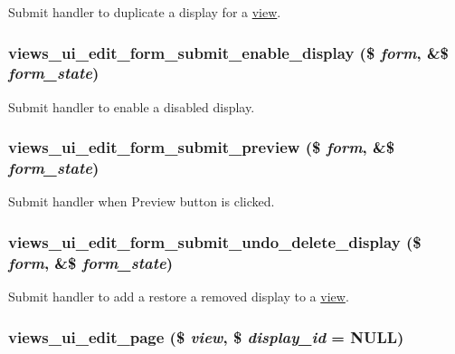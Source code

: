 \label{admin_8inc_ae053ac5c2b462e488e968d3e3ba78141}
Submit handler to duplicate a display for a \hyperlink{classview}{view}. \hypertarget{admin_8inc_af7a13d0c2cd085c0bf2486c1ded3b445}{
\subsubsection[{views\_\-ui\_\-edit\_\-form\_\-submit\_\-enable\_\-display}]{\setlength{\rightskip}{0pt plus 5cm}views\_\-ui\_\-edit\_\-form\_\-submit\_\-enable\_\-display (\$ {\em form}, \/  \&\$ {\em form\_\-state})}}
\label{admin_8inc_af7a13d0c2cd085c0bf2486c1ded3b445}
Submit handler to enable a disabled display. \hypertarget{admin_8inc_a8263cbb4980efaa11823aae67bce1e26}{
\subsubsection[{views\_\-ui\_\-edit\_\-form\_\-submit\_\-preview}]{\setlength{\rightskip}{0pt plus 5cm}views\_\-ui\_\-edit\_\-form\_\-submit\_\-preview (\$ {\em form}, \/  \&\$ {\em form\_\-state})}}
\label{admin_8inc_a8263cbb4980efaa11823aae67bce1e26}
Submit handler when Preview button is clicked. \hypertarget{admin_8inc_a82b6d7468aa9a3c2d86126ea0e61ec9f}{
\subsubsection[{views\_\-ui\_\-edit\_\-form\_\-submit\_\-undo\_\-delete\_\-display}]{\setlength{\rightskip}{0pt plus 5cm}views\_\-ui\_\-edit\_\-form\_\-submit\_\-undo\_\-delete\_\-display (\$ {\em form}, \/  \&\$ {\em form\_\-state})}}
\label{admin_8inc_a82b6d7468aa9a3c2d86126ea0e61ec9f}
Submit handler to add a restore a removed display to a \hyperlink{classview}{view}. \hypertarget{admin_8inc_ac6af463750fb21984d42b858c446635c}{
\subsubsection[{views\_\-ui\_\-edit\_\-page}]{\setlength{\rightskip}{0pt plus 5cm}views\_\-ui\_\-edit\_\-page (\$ {\em view}, \/  \$ {\em display\_\-id} = {\ttfamily NULL})}}
